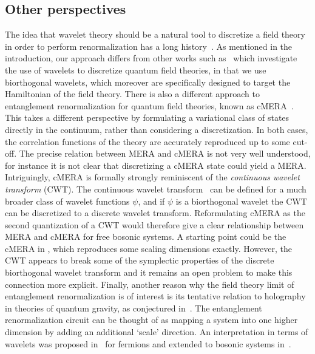 \documentclass[submission, Phys]{SciPost}
\theoremstyle{definition}
\theoremstyle{remark}
\newcommand{\change}[1]{#1}
\begin{document}
\subsection{Other perspectives}\label{sec:other perspectives}
The idea that wavelet theory should be a natural tool to discretize a field theory in order to perform renormalization has a long history~\cite{battle1999wavelets}.
As mentioned in the introduction, our approach differs from other works such as~\cite{bulut2013wavelets, brennen2015multiscale, stottmeister2020operator} which investigate the use of wavelets to discretize quantum field theories, in that we use biorthogonal wavelets, which moreover are specifically designed to target the Hamiltonian of the field theory.
There is also a different approach to entanglement renormalization for quantum field theories, known as cMERA~\cite{haegeman2013entanglement, franco2017entanglement}.
This takes a different perspective by formulating a variational class of states directly in the continuum, rather than considering a discretization.
In both cases, the correlation functions of the theory are accurately reproduced up to some cut-off.
The precise relation between MERA and cMERA is not very well understood, for instance it is not clear that discretizing a cMERA state could yield a MERA.
Intriguingly, cMERA is formally strongly reminiscent of the \emph{continuous wavelet transform} (CWT).
The continuous wavelet transform~\cite{mallat2008wavelet} can be defined for a much broader class of wavelet functions $\psi$, and if $\psi$ is a biorthogonal wavelet the CWT can be discretized to a discrete wavelet transform.
Reformulating cMERA as the second quantization of a CWT would therefore give a clear relationship between MERA and cMERA for free bosonic systems.
\change{A starting point could be the cMERA in \cite{zou2019magic}, which reproduces some scaling dimensions exactly.}
However, the CWT appears to break some of the symplectic properties of the discrete biorthogonal wavelet transform and it remains an open problem to make this connection more explicit.
Finally, another reason why the field theory limit of entanglement renormalization is of interest is its tentative relation to holography in theories of quantum gravity, as conjectured in~\cite{swingle2012entanglement}.
The entanglement renormalization circuit can be thought of as mapping a system into one higher dimension by adding an additional `scale' direction.
An interpretation in terms of wavelets was proposed in~\cite{qi2013exact} for fermions and extended to bosonic systems in~\cite{singh2016holographic}.
\end{document}
